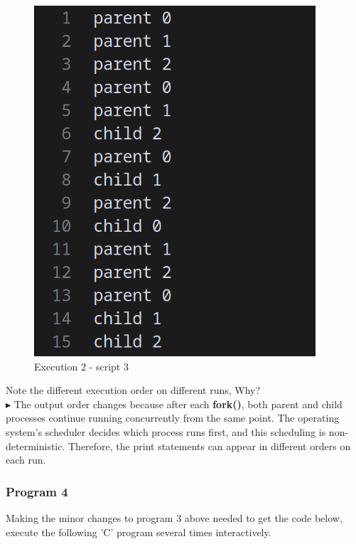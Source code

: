 \documentclass[12pt]{article}
\begin{document}
\begin{figure}[h]
\begin{minipage}{0.45\textwidth}
        \includegraphics[width=\linewidth]{images/outfile2-script3.png}
        \caption{Execution 2 - script 3}
    \end{minipage}
\end{figure}

Note the different execution order on different runs, Why? \\
\(\blacktriangleright\) The output order changes because after each \textbf{fork()}, both parent and child processes continue running concurrently from the same point. The operating system’s scheduler decides which process runs first, and this scheduling is non-deterministic. Therefore, the print statements can appear in different orders on each run.

\subsubsection*{Program 4}
Making the minor changes to program 3 above needed to get the code
below, execute the following 'C' program several times
interactively.
\end{document}

